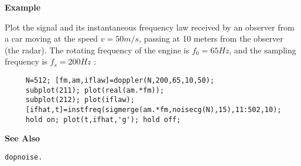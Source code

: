 \newpage

{\bf \large {}\selectfont Example}\\
\hspace*{1.5cm}
\begin{minipage}[t]{13.5cm}
Plot the signal and its instantaneous frequency law received by an observer
from a car moving at the speed $v=50 m/s$, passing at 10 meters from the
observer (the radar). The rotating frequency of the engine is $f_0=65 Hz$,
and the sampling frequency is $f_s=200 Hz$ :
\begin{verbatim}
     N=512; [fm,am,iflaw]=doppler(N,200,65,10,50); 
     subplot(211); plot(real(am.*fm)); 
     subplot(212); plot(iflaw);
     [ifhat,t]=instfreq(sigmerge(am.*fm,noisecg(N),15),11:502,10);
     hold on; plot(t,ifhat,'g'); hold off;
\end{verbatim}
\end{minipage}
\vspace*{.5cm}


{\bf \large {}\selectfont See Also}\\
\hspace*{1.5cm}
\begin{minipage}[t]{13.5cm}
\begin{verbatim}
dopnoise.
\end{verbatim}
\end{minipage}

